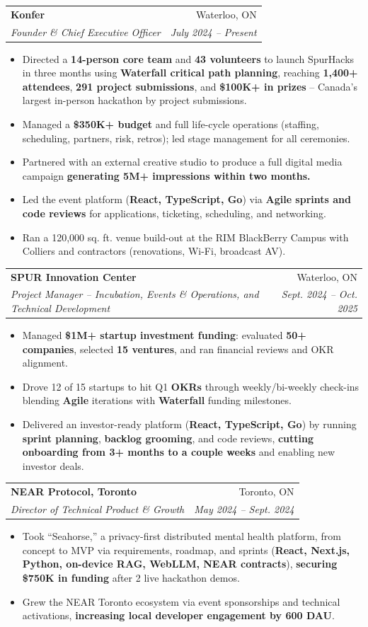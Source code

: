 \documentclass[standalone,9pt]{extarticle}
\makeatletter
\newcommand{\rowwidth}{0.97\textwidth}
\newcommand{\resumeItemListStart}{\begin{itemize}}
\newcommand{\resumeItemListEnd}{\end{itemize}\vspace{2.5pt}}
\newcommand{\resumeItem}[1]{
    \item \small{
        {#1 \vspace{-2pt}}
    }
}
\newcommand{\resumeSubheading}[4]{
    \vspace{-2pt}
    \item
    \begin{tabular*}{\rowwidth}[t]{l@{\extracolsep{\fill}}r}
        \textbf{#1} & #2 \\
        \textit{\small#3} & \textit{\small #4} \\
    \end{tabular*}
    \vspace{-6pt}
}
\makeatother
\begin{document}
        \resumeSubheading
            {Konfer}{Waterloo, ON}
            {Founder \& Chief Executive Officer}{July 2024 -- Present}
        \resumeItemListStart
            \resumeItem{Directed a \textbf{14-person core team} and \textbf{43 volunteers} to launch SpurHacks in three months using \textbf{Waterfall critical path planning}, reaching \textbf{1,400+ attendees}, \textbf{291 project submissions}, and \textbf{\$100K+ in prizes} -- Canada's largest in-person hackathon by project submissions.}
            \resumeItem{Managed a \textbf{\$350K+ budget} and full life-cycle operations (staffing, scheduling, partners, risk, retros); led stage management for all ceremonies.}
            \resumeItem{Partnered with an external creative studio to produce a full digital media campaign \textbf{generating 5M+ impressions within two months.}}
            \resumeItem{Led the event platform (\textbf{React, TypeScript, Go}) via \textbf{Agile sprints and code reviews} for applications, ticketing, scheduling, and networking.}
            \resumeItem{Ran a 120,000 sq. ft. venue build-out at the RIM BlackBerry Campus with Colliers and contractors (renovations, Wi-Fi, broadcast AV).}
        \resumeItemListEnd

        \resumeSubheading
            {SPUR Innovation Center}{Waterloo, ON}
            {Project Manager -- Incubation, Events \& Operations, and Technical Development}{Sept. 2024 -- Oct. 2025}
        \resumeItemListStart
            \resumeItem{Managed \textbf{\$1M+ startup investment funding}: evaluated \textbf{50+ companies}, selected \textbf{15 ventures}, and ran financial reviews and OKR alignment.}
            \resumeItem{Drove 12 of 15 startups to hit Q1 \textbf{OKRs} through weekly/bi-weekly check-ins blending \textbf{Agile} iterations with \textbf{Waterfall} funding milestones.}
            \resumeItem{Delivered an investor-ready platform (\textbf{React, TypeScript, Go}) by running \textbf{sprint planning}, \textbf{backlog grooming}, and code reviews, \textbf{cutting onboarding from 3+ months to a couple weeks} and enabling new investor deals.}
        \resumeItemListEnd

        \resumeSubheading
            {NEAR Protocol, Toronto}{Toronto, ON}
            {Director of Technical Product \& Growth}{May 2024 -- Sept. 2024}
        \resumeItemListStart
            \resumeItem{Took ``Seahorse,'' a privacy-first distributed mental health platform, from concept to MVP via requirements, roadmap, and sprints (\textbf{React, Next.js, Python, on-device RAG, WebLLM, NEAR contracts}), \textbf{securing \$750K in funding} after 2 live hackathon demos.}
            \resumeItem{Grew the NEAR Toronto ecosystem via event sponsorships and technical activations, \textbf{increasing local developer engagement by 600 DAU}.}
        \resumeItemListEnd
\end{document}
